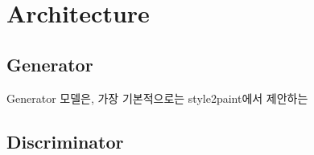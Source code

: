 \section{Architecture}
\label{sec:archi}
\subsection{Generator}

Generator 모델은, 가장 기본적으로는 style2paint에서 제안하는 

\subsection{Discriminator}